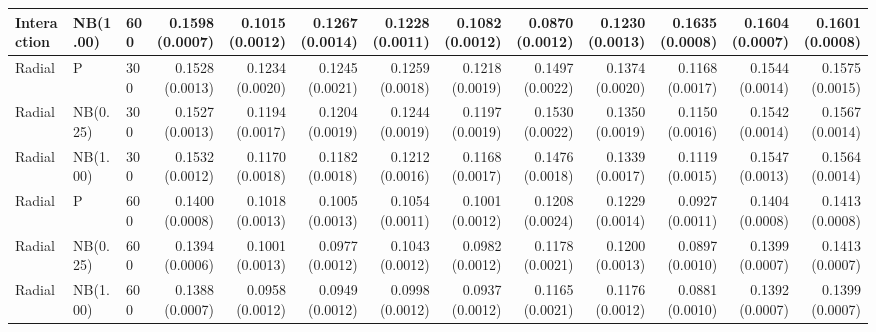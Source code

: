 \begin{table}[p]
{\begin{tabular}{lllrrrrrrrrrr}
Interaction & NB(1.00) & 600
& 0.1598 (0.0007)
& 0.1015 (0.0012)
& 0.1267 (0.0014)
& 0.1228 (0.0011)
& 0.1082 (0.0012)
& 0.0870 (0.0012)
& 0.1230 (0.0013)
& 0.1635 (0.0008)
& 0.1604 (0.0007)
& 0.1601 (0.0008) \\

\hline

Radial & P & 300
& 0.1528 (0.0013)
& 0.1234 (0.0020)
& 0.1245 (0.0021)
& 0.1259 (0.0018)
& 0.1218 (0.0019)
& 0.1497 (0.0022)
& 0.1374 (0.0020)
& 0.1168 (0.0017)
& 0.1544 (0.0014)
& 0.1575 (0.0015) \\

Radial & NB(0.25) & 300
& 0.1527 (0.0013)
& 0.1194 (0.0017)
& 0.1204 (0.0019)
& 0.1244 (0.0019)
& 0.1197 (0.0019)
& 0.1530 (0.0022)
& 0.1350 (0.0019)
& 0.1150 (0.0016)
& 0.1542 (0.0014)
& 0.1567 (0.0014) \\

Radial & NB(1.00) & 300
& 0.1532 (0.0012)
& 0.1170 (0.0018)
& 0.1182 (0.0018)
& 0.1212 (0.0016)
& 0.1168 (0.0017)
& 0.1476 (0.0018)
& 0.1339 (0.0017)
& 0.1119 (0.0015)
& 0.1547 (0.0013)
& 0.1564 (0.0014) \\

Radial & P & 600
& 0.1400 (0.0008)
& 0.1018 (0.0013)
& 0.1005 (0.0013)
& 0.1054 (0.0011)
& 0.1001 (0.0012)
& 0.1208 (0.0024)
& 0.1229 (0.0014)
& 0.0927 (0.0011)
& 0.1404 (0.0008)
& 0.1413 (0.0008) \\

Radial & NB(0.25) & 600
& 0.1394 (0.0006)
& 0.1001 (0.0013)
& 0.0977 (0.0012)
& 0.1043 (0.0012)
& 0.0982 (0.0012)
& 0.1178 (0.0021)
& 0.1200 (0.0013)
& 0.0897 (0.0010)
& 0.1399 (0.0007)
& 0.1413 (0.0007) \\

Radial & NB(1.00) & 600
& 0.1388 (0.0007)
& 0.0958 (0.0012)
& 0.0949 (0.0012)
& 0.0998 (0.0012)
& 0.0937 (0.0012)
& 0.1165 (0.0021)
& 0.1176 (0.0012)
& 0.0881 (0.0010)
& 0.1392 (0.0007)
& 0.1399 (0.0007) \\

\hline
\end{tabular}%
}
\end{table}


